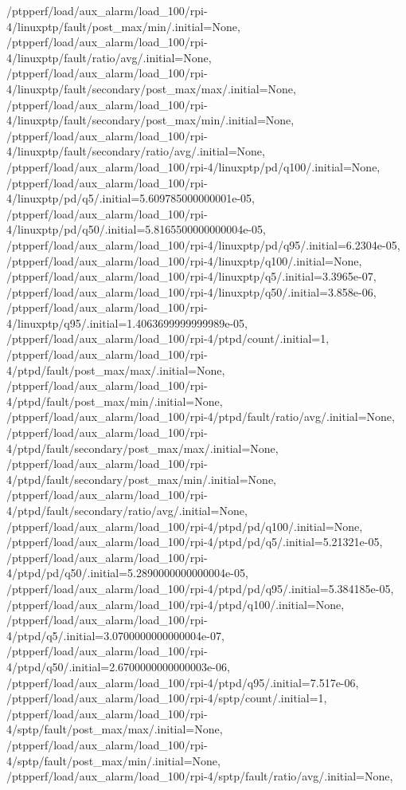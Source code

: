 {    /ptpperf/load/aux_alarm/load_100/rpi-4/linuxptp/fault/post_max/min/.initial=None,
    /ptpperf/load/aux_alarm/load_100/rpi-4/linuxptp/fault/ratio/avg/.initial=None,
    /ptpperf/load/aux_alarm/load_100/rpi-4/linuxptp/fault/secondary/post_max/max/.initial=None,
    /ptpperf/load/aux_alarm/load_100/rpi-4/linuxptp/fault/secondary/post_max/min/.initial=None,
    /ptpperf/load/aux_alarm/load_100/rpi-4/linuxptp/fault/secondary/ratio/avg/.initial=None,
    /ptpperf/load/aux_alarm/load_100/rpi-4/linuxptp/pd/q100/.initial=None,
    /ptpperf/load/aux_alarm/load_100/rpi-4/linuxptp/pd/q5/.initial=5.609785000000001e-05,
    /ptpperf/load/aux_alarm/load_100/rpi-4/linuxptp/pd/q50/.initial=5.8165500000000004e-05,
    /ptpperf/load/aux_alarm/load_100/rpi-4/linuxptp/pd/q95/.initial=6.2304e-05,
    /ptpperf/load/aux_alarm/load_100/rpi-4/linuxptp/q100/.initial=None,
    /ptpperf/load/aux_alarm/load_100/rpi-4/linuxptp/q5/.initial=3.3965e-07,
    /ptpperf/load/aux_alarm/load_100/rpi-4/linuxptp/q50/.initial=3.858e-06,
    /ptpperf/load/aux_alarm/load_100/rpi-4/linuxptp/q95/.initial=1.4063699999999989e-05,
    /ptpperf/load/aux_alarm/load_100/rpi-4/ptpd/count/.initial=1,
    /ptpperf/load/aux_alarm/load_100/rpi-4/ptpd/fault/post_max/max/.initial=None,
    /ptpperf/load/aux_alarm/load_100/rpi-4/ptpd/fault/post_max/min/.initial=None,
    /ptpperf/load/aux_alarm/load_100/rpi-4/ptpd/fault/ratio/avg/.initial=None,
    /ptpperf/load/aux_alarm/load_100/rpi-4/ptpd/fault/secondary/post_max/max/.initial=None,
    /ptpperf/load/aux_alarm/load_100/rpi-4/ptpd/fault/secondary/post_max/min/.initial=None,
    /ptpperf/load/aux_alarm/load_100/rpi-4/ptpd/fault/secondary/ratio/avg/.initial=None,
    /ptpperf/load/aux_alarm/load_100/rpi-4/ptpd/pd/q100/.initial=None,
    /ptpperf/load/aux_alarm/load_100/rpi-4/ptpd/pd/q5/.initial=5.21321e-05,
    /ptpperf/load/aux_alarm/load_100/rpi-4/ptpd/pd/q50/.initial=5.2890000000000004e-05,
    /ptpperf/load/aux_alarm/load_100/rpi-4/ptpd/pd/q95/.initial=5.384185e-05,
    /ptpperf/load/aux_alarm/load_100/rpi-4/ptpd/q100/.initial=None,
    /ptpperf/load/aux_alarm/load_100/rpi-4/ptpd/q5/.initial=3.0700000000000004e-07,
    /ptpperf/load/aux_alarm/load_100/rpi-4/ptpd/q50/.initial=2.6700000000000003e-06,
    /ptpperf/load/aux_alarm/load_100/rpi-4/ptpd/q95/.initial=7.517e-06,
    /ptpperf/load/aux_alarm/load_100/rpi-4/sptp/count/.initial=1,
    /ptpperf/load/aux_alarm/load_100/rpi-4/sptp/fault/post_max/max/.initial=None,
    /ptpperf/load/aux_alarm/load_100/rpi-4/sptp/fault/post_max/min/.initial=None,
    /ptpperf/load/aux_alarm/load_100/rpi-4/sptp/fault/ratio/avg/.initial=None,
}

